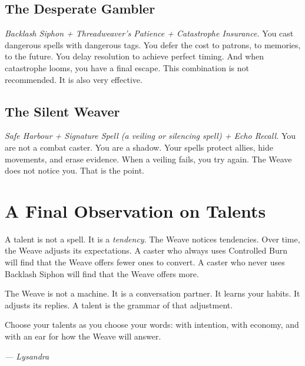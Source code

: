 \subsection{The Desperate Gambler}

\emph{Backlash Siphon + Threadweaver's Patience + Catastrophe Insurance.} You cast dangerous spells with dangerous tags. You defer the cost to patrons, to memories, to the future. You delay resolution to achieve perfect timing. And when catastrophe looms, you have a final escape. This combination is not recommended. It is also very effective.

\subsection{The Silent Weaver}

\emph{Safe Harbour + Signature Spell (a veiling or silencing spell) + Echo Recall.} You are not a combat caster. You are a shadow. Your spells protect allies, hide movements, and erase evidence. When a veiling fails, you try again. The Weave does not notice you. That is the point.

\section{A Final Observation on Talents}

A talent is not a spell. It is a \emph{tendency}. The Weave notices tendencies. Over time, the Weave adjusts its expectations. A caster who always uses Controlled Burn will find that the Weave offers fewer ones to convert. A caster who never uses Backlash Siphon will find that the Weave offers more.

The Weave is not a machine. It is a conversation partner. It learns your habits. It adjusts its replies. A talent is the grammar of that adjustment.

Choose your talents as you choose your words: with intention, with economy, and with an ear for how the Weave will answer.

\textit{--- Lysandra}